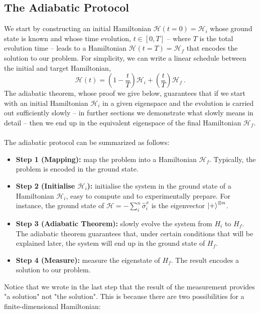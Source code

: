 \subsection{The Adiabatic Protocol}
We start by constructing an initial Hamiltonian $\mathcal{H}(t=0) = \mathcal{H}_{i}$ whose ground state is known and whose time evolution, $t \in \left[0,T\right]$ -- where $T$ is the total evolution time -- leads to a Hamiltonian $\mathcal{H}(t=T) = \mathcal{H}_{f}$ that encodes the solution to our problem. For simplicity, we can write a linear schedule between the initial and target Hamiltonian,
\begin{equation}
\label{eq:Htime}
    \mathcal{H}(t) = \left(1-\frac{t}{T}\right)\mathcal{H}_{i} + \left(\frac{t}{T} \right)\mathcal{H}_{f}\ .
\end{equation}
The adiabatic theorem, whose proof we give below, guarantees that if we start with an initial Hamiltonian $\mathcal{H}_{i}$ in a given eigenspace and the evolution is carried out sufficiently slowly -- in further sections we demonstrate what slowly means in detail -- then we end up in the equivalent eigenspace of the final Hamiltonian $\mathcal{H}_{f}$. \\\\
The adiabatic protocol can be summarized as follows:
\begin{itemize}
    \item \textbf{Step 1 (Mapping):} map the problem into a Hamiltonian $\mathcal{H}_{f}$. Typically, the problem is encoded in the ground state.
    \item \textbf{Step 2 (Initialise $\mathcal{H}_{i}$):} initialise the system in the ground state of a Hamiltonian $\mathcal{H}_{i}$, easy to compute and to experimentally prepare. For instance, the ground state of $\mathcal{H} = - \sum_{i}^{n}\hat{\sigma}_{i}^{x}$ is the eigenvector $\ket{+}^{\otimes n}$.
    \item \textbf{Step 3 (Adiabatic Theorem):} slowly evolve the system from $H_{i}$ to $H_{f}$. The adiabatic theorem guarantees that, under certain conditions that will be explained later, the system will end up in the ground state of $H_{f}$.
    \item \textbf{Step 4 (Measure):} measure the eigenstate of $H_{f}$. The result encodes a solution to our problem.
\end{itemize}
Notice that we wrote in the last step that the result of the measurement provides "a solution" not "the solution". This is because there are two possibilities for a finite-dimensional Hamiltonian:
